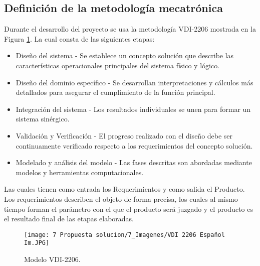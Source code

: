 
\subsection{Definición de la metodología mecatrónica}

Durante el desarrollo del proyecto se usa la metodología VDI-2206 mostrada en la Figura \ref{VDI2206}. La cual consta de las siguientes etapas:




\begin{itemize}
    \item Diseño del sistema - Se establece un concepto solución  que describe las características operacionales principales del sistema físico y lógico.
    \item Diseño del dominio específico - Se desarrollan interpretaciones y cálculos más detallados para asegurar el cumplimiento de la función principal.
    \item Integración del sistema - Los resultados individuales se unen para formar un sistema sinérgico.
    \item Validación y Verificación - El progreso realizado con el diseño debe ser continuamente verificado respecto a los requerimientos del concepto solución.
    \item Modelado y análisis del modelo - Las fases descritas son abordadas mediante modelos y herramientas computacionales.
\end{itemize}

Las cuales tienen como entrada los Requerimientos y como salida el Producto. Los requerimientos describen el objeto de forma precisa, los cuales al mismo tiempo forman el parámetro con el que el producto será juzgado y el producto es el resultado final de las etapas elaboradas.
\begin{figure}[htbp]
    \texttt{[image: 7 Propuesta solucion/7\_Imagenes/VDI 2206 Español Im.JPG]}
    \caption{Modelo VDI-2206.}
    \label{VDI2206}
\end{figure}